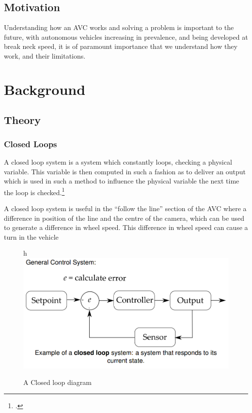 \documentclass[paper=a4, fontsize=11pt]{scrartcl} %
\numberwithin{equation}{section} %
\numberwithin{figure}{section} %
\begin{document}
\subsection{Motivation}
Understanding how an AVC works and solving a problem is important to the future,
with autonomous vehicles increasing in prevalence, and being developed at break
neck speed, it is of paramount importance that we understand how they work, and
their limitations.
\section{Background}
\subsection{Theory}
\subsubsection{Closed Loops}
A closed loop system is a system which constantly loops, checking a physical
variable. This variable is then computed in such a fashion as to deliver an
output which is used in such a method to influence the physical variable the
next time the loop is checked.\footcite{elfClosedLoops}

A closed loop system is useful in the ``follow the line'' section of the AVC
where a difference in position of the line and the centre of the camera, which
can be used to generate a difference in wheel speed. This difference in wheel
speed can cause a turn in the vehicle

\begin{figure}{h}
\includegraphics[width=\textwidth]{closedloop}
\centering
\caption{A Closed loop diagram \autocite{elfClosedLoops}}
\end{figure}
\end{document}
